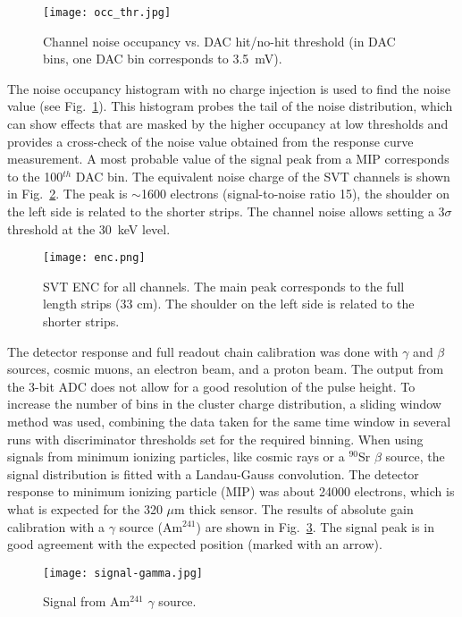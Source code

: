 \begin{figure}[hbt] 
\centering 
\texttt{[image: occ\_thr.jpg]}
\caption{Channel noise occupancy vs. DAC hit/no-hit threshold (in DAC bins, one DAC bin corresponds to 3.5~mV).}
\label{fig:noiseocc}
\end{figure}

The noise occupancy histogram with no charge injection is used to find the noise value (see Fig.~\ref{fig:noiseocc}). This histogram probes the tail of the noise distribution, which can show effects that are masked by the higher occupancy at low thresholds and provides a cross-check of the noise value obtained from the response curve measurement. A most probable value of the signal peak from a MIP corresponds to the 100$^{th}$ DAC bin. The equivalent noise charge of the SVT channels is shown in  Fig.~\ref{fig:enc}. The peak is $\sim$1600 electrons (signal-to-noise ratio 15), the shoulder on the left side is related to the shorter strips. The channel noise allows setting a 3$\sigma$ threshold at the 30~keV level. 

\begin{figure}[hbt] 
	\centering 
	\texttt{[image: enc.png]}
	\caption{SVT ENC for all channels. The main peak corresponds to the full length strips (33 cm). The shoulder on the left side is related to the shorter strips.}
	\label{fig:enc}
\end{figure}

The detector response and full readout chain calibration was done with $\gamma$ and $\beta$ sources, cosmic muons, an electron beam, and a proton beam. The output from the 3-bit ADC does not allow for a good resolution of the pulse height. To increase the number of bins in the cluster charge distribution, a sliding window method was used, combining the data taken for the same time window in several runs with discriminator thresholds set for the required binning. When using signals from minimum ionizing particles, like cosmic rays or a $^{90}$Sr $\beta$ source, the signal distribution is fitted with a Landau-Gauss convolution. The detector response to minimum ionizing particle (MIP) was about 24000 electrons, which is what is expected for the 320 $\mu$m thick sensor. The results of absolute gain calibration with a $\gamma$ source (Am$^{241}$) are shown in Fig.~\ref{fig:signal-gamma}. The signal peak is in good agreement with the expected position (marked with an arrow). 

\begin{figure}[hbt] 
	\centering 
	\texttt{[image: signal-gamma.jpg]}
	\caption{Signal from Am$^{241}$ $\gamma$ source.}
	\label{fig:signal-gamma}
\end{figure}

